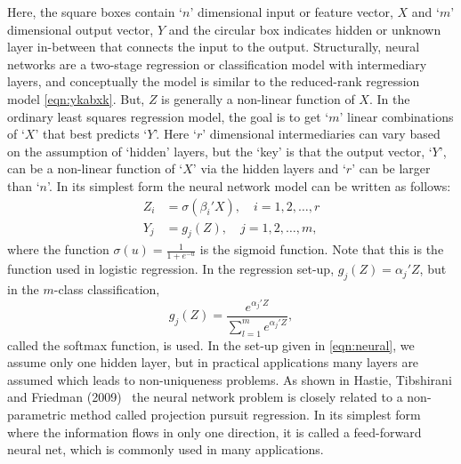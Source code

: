 Here, the square boxes contain `$n$' dimensional input or feature vector, $X$ and `$m$' dimensional output vector, $Y$ and the circular box indicates hidden or unknown layer in-between that connects the input to the output. Structurally, neural networks are a two-stage regression or classification model with intermediary layers, and conceptually the model is similar to the reduced-rank regression model \ref{eqn:ykabxk}. But, $Z$ is generally a non-linear function of $X$. In the ordinary least squares regression model, the goal is to get `$m$' linear combinations of `$X$' that best predicts `$Y$'. Here `$r$' dimensional intermediaries can vary based on the assumption of `hidden' layers, but the `key' is that the output vector, `$Y$', can be a non-linear function of `$X$' via the hidden layers and `$r$' can be larger than `$n$'. In its simplest form the neural network model can be written as follows:
	\begin{equation} \label{eqn:neurallabel}
	\begin{split}
	Z_i&= \sigma(\beta_i'X), \quad i=1,2,\ldots,r \\
	Y_j&= g_j(Z), \quad j=1,2,\ldots,m,
	\end{split}
	\end{equation}
where the function $\sigma(u)=\frac{1}{1+e^{-u}}$ is the sigmoid function. Note that this is the  function used in logistic regression. In the regression set-up, $g_j(Z)=\alpha_j' Z$, but in the $m$-class classification,
	\begin{equation} \label{eqn:gjzclass}
	g_j(Z)= \dfrac{e^{\alpha_j' Z}}{\displaystyle\sum_{l=1}^m e^{\alpha_j' Z}},
	\end{equation}
called the softmax function, is used. In the set-up given in \eqref{eqn:neural}, we assume only one hidden layer, but in practical applications many layers are assumed which leads to non-uniqueness problems. As shown in Hastie, Tibshirani and Friedman (2009)~\cite{hastibf} the neural network problem is closely related to a non-parametric method called projection pursuit regression. In its simplest form where the information flows in only one direction, it is called a feed-forward neural net, which is commonly used in many applications.


